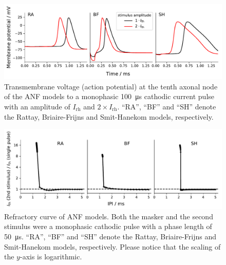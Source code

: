 \documentclass[utf8]{frontiersSCNS} %
\newcommand{\T}[1]{\text{#1}}
\begin{document}
\begin{figure}[h!]
\begin{center}
\includegraphics[width=\linewidth]{images/single_node_response_comparison.pdf}
\end{center}
\caption{Transmembrane voltage (action potential) at the tenth axonal node of the ANF models to a monophasic \SI{100}{\micro\second} cathodic current pulse with an amplitude of $I_{\T{rh}}$ and $2\times I_{\T{rh}}$. ``RA'', ``BF'' and ``SH'' denote the Rattay, Briaire-Frijns and Smit-Hanekom models, respectively.}
\label{fig:single_node_response_figure}
\end{figure}

\begin{figure}[h!]
\begin{center}
\includegraphics[width=\linewidth]{images/refractory_curves_plot_comparison.pdf}
\end{center}
\caption{Refractory curve of ANF models. Both the masker and the second stimulus were a monophasic cathodic pulse with a phase length of \SI{50}{\micro\second}. ``RA'', ``BF'' and ``SH'' denote the Rattay, Briaire-Frijns and Smit-Hanekom models, respectively. Please notice that the scaling of the $y$-axis is logarithmic.}
\label{fig:refractory_curves}
\end{figure}
\end{document}
